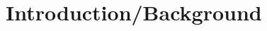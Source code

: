 \documentclass[../mthe-493-project-proposal.tex]{subfiles}
\begin{document}
    \chapter{Introduction/Background}
    \label{ch:introduction}

    \Blindtext
\end{document}
